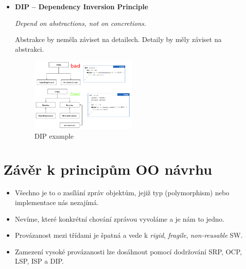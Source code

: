\documentclass{szzclass}
\begin{document}
\begin{itemize}
      \item \textbf{DIP -- Dependency Inversion Principle}
      
      \textit{Depend on abstractions, not on concretions.}

      Abstrakce by neměla záviset na detailech. Detaily by měly záviset na abstrakci.
      \begin{figure}[ht]
            \centering
            \includegraphics[width=0.5\textwidth]{topics/bi-wsi-si-9/dip.png}
            \caption{DIP example}
      \end{figure}


\end{itemize}

\section{Závěr k principům OO návrhu}

\begin{itemize}
      \item Všechno je to o zasílání zpráv objektům, jejiž typ (polymorphism) nebo implementace nás nezajímá.
      \item Nevíme, které konkrétní chování zprávou vyvoláme a je nám to jedno.
      \item Provázanost mezi třídami je špatná a vede k \textit{rigid}, \textit{fragile}, \textit{non-reusable} SW.
      \item Zamezení vysoké provázanosti lze dosáhnout pomocí dodržování SRP, OCP, LSP, ISP a DIP.
\end{itemize}
\end{document}
